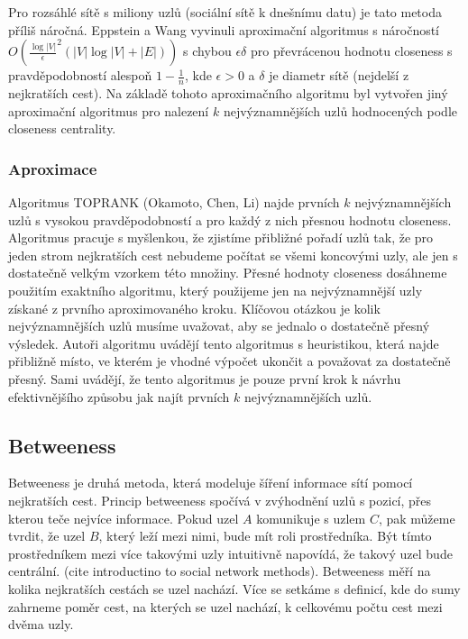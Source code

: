 \documentclass[12pt,titlepage]{report}
\begin{document}
Pro rozsáhlé sítě s miliony uzlů (sociální sítě k dnešnímu datu) je tato
metoda příliš náročná. Eppstein a Wang vyvinuli aproximační algoritmus s
náročností $O(\frac{\log|V|}{\epsilon}^2 (|V| \log |V| + |E|))$ s chybou
$\epsilon \delta$ pro převrácenou hodnotu closeness s pravděpodobností alespoň
$1 - \frac{1}{n}$, kde $\epsilon > 0$ a $\delta$ je diametr sítě (nejdelší z
nejkratších cest). Na základě tohoto aproximačního algoritmu byl vytvořen jiný
aproximační algoritmus pro nalezení $k$ nejvýznamnějších uzlů hodnocených podle
closeness centrality.

\subsubsection{Aproximace}
Algoritmus TOPRANK (Okamoto, Chen, Li) najde prvních $k$ nejvýznamnějších uzlů
s vysokou pravděpodobností a pro každý z nich přesnou hodnotu closeness.
Algoritmus pracuje s myšlenkou, že zjistíme přibližné pořadí uzlů tak, že pro
jeden strom nejkratších cest nebudeme počítat se všemi koncovými uzly, ale jen
s dostatečně velkým vzorkem této množiny.  Přesné hodnoty closeness dosáhneme
použitím exaktního algoritmu, který použijeme jen na nejvýznamnější uzly
získané z prvního aproximovaného kroku. Klíčovou otázkou je kolik
nejvýznamnějších uzlů musíme uvažovat, aby se jednalo o dostatečně přesný
výsledek. Autoři algoritmu uvádějí tento algoritmus s heuristikou, která najde
přibližně místo, ve kterém je vhodné výpočet ukončit a považovat za dostatečně
přesný. Sami uvádějí, že tento algoritmus je pouze první krok k návrhu
efektivnějšího způsobu jak najít prvních $k$ nejvýznamnějších uzlů.

\subsection{Betweeness}
Betweeness je druhá metoda, která modeluje šíření informace sítí pomocí
nejkratších cest. Princip betweeness spočívá v zvýhodnění uzlů s pozicí, přes
kterou teče nejvíce informace. Pokud uzel $A$ komunikuje s uzlem $C$, pak
můžeme tvrdit, že uzel $B$, který leží mezi nimi, bude mít roli prostředníka.
Být tímto prostředníkem mezi více takovými uzly intuitivně napovídá, že takový
uzel bude centrální.  (cite introductino to social network methods).
Betweeness měří na kolika nejkratších cestách se uzel nachází. Více se setkáme
s definicí, kde do sumy zahrneme poměr cest, na kterých se uzel nachází, k celkovému počtu cest mezi dvěma uzly.
\end{document}
